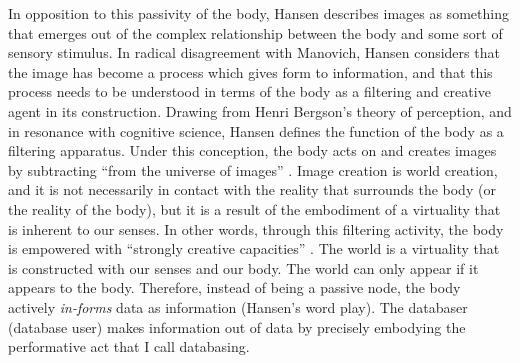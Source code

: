 In opposition to this passivity of the body, Hansen describes images as something that emerges out of the complex relationship between the body and some sort of sensory stimulus. In radical disagreement with Manovich, Hansen considers that the image has become a process which gives form to information, and that this process needs to be understood in terms of the body as a filtering and creative agent in its construction. Drawing from Henri Bergson's theory of perception, and in resonance with cognitive science, Hansen defines the function of the body as a filtering apparatus. Under this conception, the body acts on and creates images by subtracting ``from the universe of images'' \parencite[3]{Han04:New}. Image creation is world creation, and it is not necessarily in contact with the reality that surrounds the body (or the reality of the body), but it is a result of the embodiment of a virtuality that is inherent to our senses. In other words, through this filtering activity, the body is empowered with ``strongly creative capacities'' \parencite[4]{Han04:New}. The world is a virtuality that is constructed with our senses and our body. The world can only appear if it appears to the body. Therefore, instead of being a passive node, the body actively \textit{in-forms} data as information (Hansen's word play). The databaser (database user) makes information out of data by precisely embodying the performative act that I call databasing. 

